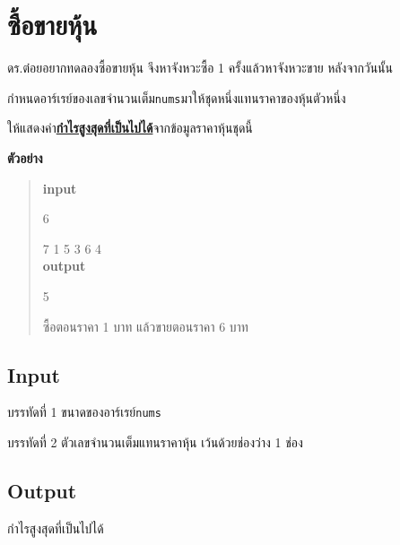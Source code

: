 \documentclass{article}
\begin{document}
\section*{ซื้อขายหุ้น}

ดร.ต๋อยอยากทดลองซื้อขายหุ้น จึงหาจังหวะซื้อ 1 ครั้งแล้วหาจังหวะขาย หลังจากวันนั้น

กำหนดอาร์เรย์ของเลขจำนวนเต็ม\texttt{nums}มาให้ชุดหนึ่งแทนราคาของหุ้นตัวหนึ่ง

ให้แสดงค่า\ul{\textbf{กำไรสูงสุดที่เป็นไปได้}}จากข้อมูลราคาหุ้นชุดนี้\\



\hfill\break



\textbf{ตัวอย่าง}



\begin{quote}

\textbf{input}



6



7 1 5 3 6 4\\



\textbf{output}



5



{ซื้อตอนราคา 1 บาท แล้วขายตอนราคา 6 บาท}

\end{quote}



\subsection*{Input}
บรรทัดที่ 1 ขนาดของอาร์เรย์\texttt{nums}



บรรทัดที่ 2 ตัวเลขจำนวนเต็มแทนราคาหุ้น เว้นด้วยช่องว่าง 1 ช่อง



\subsection*{Output}
กำไรสูงสุดที่เป็นไปได้\\
\end{document}
